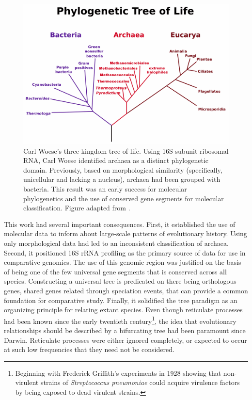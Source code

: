 \begin{figure}
\centering
\includegraphics[width=.7\columnwidth]{./fig/introduction/woese_tree.png}
\caption[Carl Woese's Three Domain Tree of Life]{Carl Woese's three kingdom tree of life. Using 16S subunit ribosomal RNA, Carl Woese identified archaea as a distinct phylogenetic domain. Previously, based on morphological similarity (specifically, unicellular and lacking a nucleus), archaea had been grouped with bacteria. This result was an early success for molecular phylogenetics and the use of conserved gene segments for molecular classification. Figure adapted from \cite{Woese:1990uc}.}
\label{fig:woese_tree}
\end{figure}

This work had several important consequences.
First, it established the use of molecular data to inform about large-scale patterns of evolutionary history.
Using only morphological data had led to an inconsistent classification of archaea.
Second, it positioned 16S rRNA profiling as the primary source of data for use in comparative genomics.
The use of this genomic region was justified on the basis of being one of the few universal gene segments that is conserved across all species.
Constructing a universal tree is predicated on there being orthologous genes, shared genes related through speciation events, that can provide a common foundation for comparative study.
Finally, it solidified the tree paradigm as an organizing principle for relating extant species.
Even though reticulate processes had been known since the early twentieth century\footnote{Beginning with Frederick Griffith's experiments in 1928 showing that non-virulent strains of \emph{Streptococcus pneumoniae} could acquire virulence factors by being exposed to dead virulent strains.}, the idea that evolutionary relationships should be described by a bifurcating tree had been paramount since Darwin. 
Reticulate processes were either ignored completely, or expected to occur at such low frequencies that they need not be considered.

